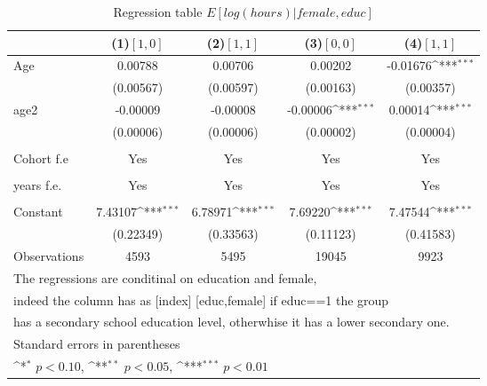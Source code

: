 \begin{table}[htbp]\centering
\def\sym#1{\ifmmode^{#1}\else\(^{#1}\)\fi}
\caption{Regression table \(E[log(hours)|female,educ]\) \label{reg4}}
\begin{tabular}{l*{4}{c}}
\toprule
                    &\multicolumn{1}{c}{(1)\([1,0]\)\label{Reg:4_h_m}}         &\multicolumn{1}{c}{(2)\([1,1]\)\label{Reg:4_h_f}}         &\multicolumn{1}{c}{(3)\([0,0]\)\label{Reg:4_l_m}}         &\multicolumn{1}{c}{(4)\([1,1]\)\label{Reg:4_l_m}}         \\
\midrule
Age                 &     0.00788         &     0.00706         &     0.00202         &    -0.01676\sym{***}\\
                    &   (0.00567)         &   (0.00597)         &   (0.00163)         &   (0.00357)         \\
\addlinespace
age2                &    -0.00009         &    -0.00008         &    -0.00006\sym{***}&     0.00014\sym{***}\\
                    &   (0.00006)         &   (0.00006)         &   (0.00002)         &   (0.00004)         \\
                    \\
                    Cohort f.e           &       Yes        &      Yes &       Yes        &      Yes \\
                                                \\
                    \addlinespace
                    years f.e.            &       Yes         &       Yes   &       Yes        &      Yes       \\
                                               \\
                    \addlinespace
Constant            &     7.43107\sym{***}&     6.78971\sym{***}&     7.69220\sym{***}&     7.47544\sym{***}\\
                    &   (0.22349)         &   (0.33563)         &   (0.11123)         &   (0.41583)         \\
\midrule
Observations        &        4593         &        5495         &       19045         &        9923         \\
\bottomrule
\multicolumn{5}{l}{\footnotesize The regressions are conditinal on education and female, }\\
\multicolumn{5}{l}{\footnotesize  indeed the column has as [index]
[educ,female] if educ==1 the group  }\\
\multicolumn{5}{l}{\footnotesize has a secondary school education level, otherwhise it has a lower secondary one.}\\
\multicolumn{5}{l}{\footnotesize Standard errors in parentheses}\\
\multicolumn{5}{l}{\footnotesize \sym{*} \(p<0.10\), \sym{**} \(p<0.05\), \sym{***} \(p<0.01\)}\\
\end{tabular}
\end{table}
